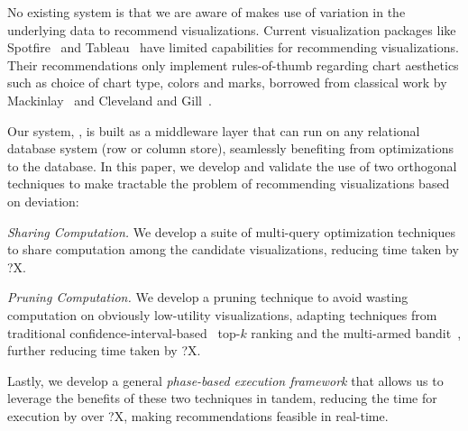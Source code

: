 





No existing system is that we are aware of makes use of variation in the underlying
data to recommend visualizations.  
Current visualization packages like Spotfire~\cite{Ahlberg:1996:SIE:245882.245893} and Tableau~\cite{tableau,polaris} have limited capabilities for 
recommending visualizations.
Their recommendations only implement rules-of-thumb 
regarding chart aesthetics such as choice of
chart type, colors and marks, borrowed from
classical work by Mackinlay~\cite{Mackinlay:1986:ADG:22949.22950} and Cleveland and Gill~\cite{cleveland1984graphical}.


Our system, \SeeDB, is built as a middleware layer that can run on any 
relational database system (row or column store), 
seamlessly benefiting from optimizations to 
the database. 
In this paper, we develop and validate the use of  
two orthogonal techniques to make tractable the problem
of recommending visualizations based on deviation:
\begin{denselist}
\item {\em Sharing Computation.} 
We develop a suite of multi-query optimization techniques to share computation
among the candidate visualizations,
reducing time taken by ?X. 
\item {\em Pruning Computation.}
We develop a pruning technique to avoid wasting computation
on obviously low-utility visualizations, adapting
techniques from traditional 
  confidence-interval-based~\cite{hoeffding1963probability} 
  top-$k$ ranking and the
  multi-armed bandit~\cite{bandits},
  further reducing time taken by ?X. 
\end{denselist}
Lastly, we develop a general {\em phase-based execution framework}
that allows us to leverage the benefits of these two techniques
in tandem, reducing the time for execution by over ?X,
making recommendations feasible in real-time. 

